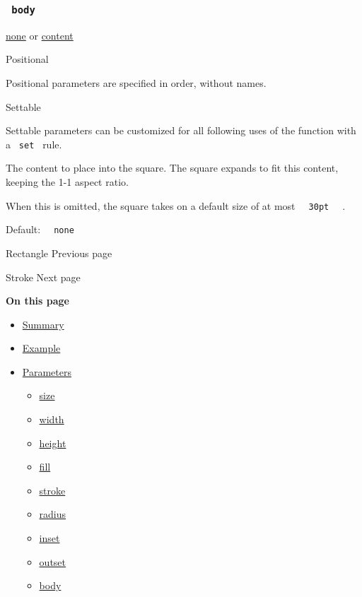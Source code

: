 \subsubsection{\texorpdfstring{\texttt{\ body\ }}{ body }}\label{parameters-body}

\href{/docs/reference/foundations/none/}{none} {or}
\href{/docs/reference/foundations/content/}{content}

{{ Positional }}

\label{parameters-body-positional-tooltip}
Positional parameters are specified in order, without names.

{{ Settable }}

\label{parameters-body-settable-tooltip}
Settable parameters can be customized for all following uses of the
function with a \texttt{\ set\ } rule.

The content to place into the square. The square expands to fit this
content, keeping the 1-1 aspect ratio.

When this is omitted, the square takes on a default size of at most
\texttt{\ }{\texttt{\ 30pt\ }}\texttt{\ } .

Default: \texttt{\ }{\texttt{\ none\ }}\texttt{\ }

\href{/docs/reference/visualize/rect/}{\pandocbounded{}}

{ Rectangle } { Previous page }

\href{/docs/reference/visualize/stroke/}{\pandocbounded{}}

{ Stroke } { Next page }

\textbf{On this page}

\begin{itemize}
\tightlist
\item
  \hyperref[summary]{Summary}
\item
  \hyperref[example]{Example}
\item
  \hyperref[parameters]{Parameters}

  \begin{itemize}
  \tightlist
  \item
    \hyperref[parameters-size]{size}
  \item
    \hyperref[parameters-width]{width}
  \item
    \hyperref[parameters-height]{height}
  \item
    \hyperref[parameters-fill]{fill}
  \item
    \hyperref[parameters-stroke]{stroke}
  \item
    \hyperref[parameters-radius]{radius}
  \item
    \hyperref[parameters-inset]{inset}
  \item
    \hyperref[parameters-outset]{outset}
  \item
    \hyperref[parameters-body]{body}
  \end{itemize}
\end{itemize}

